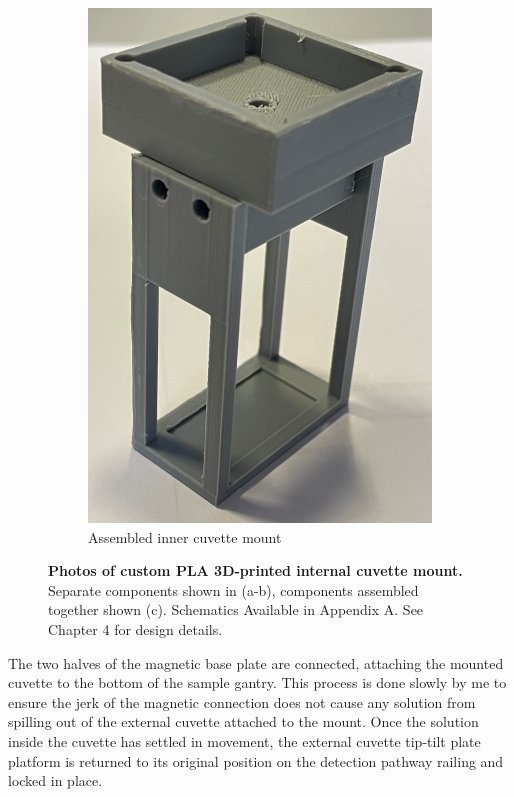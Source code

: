 \begin{figure}[H]
\begin{subfigure}[a]{0.25\textwidth}
    \includegraphics[width=1\linewidth]{Images/Combined_Mount.png}
    \caption{Assembled inner cuvette mount}
    \end{subfigure}
    
    \caption{\textbf{Photos of custom PLA 3D-printed internal cuvette mount.} Separate components shown in (a-b), components assembled together shown (c). Schematics Available in Appendix A. See Chapter 4 for design details.}
    
\end{figure}

The two halves of the magnetic base plate are connected, attaching the mounted cuvette to the bottom of the sample gantry. This process is done slowly by me to ensure the jerk of the magnetic connection does not cause any solution from spilling out of the external cuvette attached to the mount. Once the solution inside the cuvette has settled in movement, the external cuvette tip-tilt plate platform is returned to its original position on the detection pathway railing and locked in place. 

